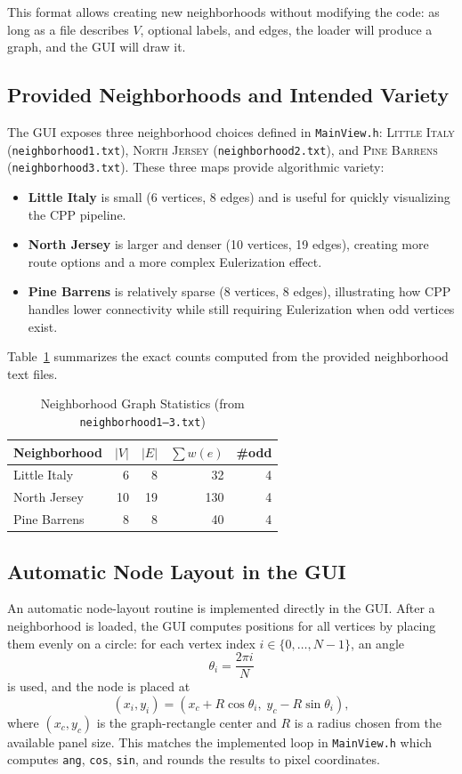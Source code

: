 \documentclass[conference]{IEEEtran}
\begin{document}
This format allows creating new neighborhoods without modifying the code: as long as a file describes $V$, optional labels, and edges, the loader will produce a graph, and the GUI will draw it.

\subsection{Provided Neighborhoods and Intended Variety}
The GUI exposes three neighborhood choices defined in \texttt{MainView.h}:
\textsc{Little Italy} (\texttt{neighborhood1.txt}),
\textsc{North Jersey} (\texttt{neighborhood2.txt}), and
\textsc{Pine Barrens} (\texttt{neighborhood3.txt}).
These three maps provide algorithmic variety:
\begin{itemize}
  \item \textbf{Little Italy} is small (6 vertices, 8 edges) and is useful for quickly visualizing the CPP pipeline.
  \item \textbf{North Jersey} is larger and denser (10 vertices, 19 edges), creating more route options and a more complex Eulerization effect.
  \item \textbf{Pine Barrens} is relatively sparse (8 vertices, 8 edges), illustrating how CPP handles lower connectivity while still requiring Eulerization when odd vertices exist.
\end{itemize}

Table~\ref{tab:neigh} summarizes the exact counts computed from the provided neighborhood text files.

\begin{table}[t]
\caption{Neighborhood Graph Statistics (from \texttt{neighborhood1--3.txt})}
\label{tab:neigh}
\centering
\begin{tabular}{lrrrr}
\toprule
Neighborhood & $|V|$ & $|E|$ & $\sum w(e)$ & \#odd \\
\midrule
Little Italy   & 6  & 8  & 32  & 4 \\
North Jersey   & 10 & 19 & 130 & 4 \\
Pine Barrens   & 8  & 8  & 40  & 4 \\
\bottomrule
\end{tabular}
\end{table}

\subsection{Automatic Node Layout in the GUI}
An automatic node-layout routine is implemented directly in the GUI.
After a neighborhood is loaded, the GUI computes positions for all vertices by placing them evenly on a circle:
for each vertex index $i\in\{0,\dots,N-1\}$, an angle
\[
  \theta_i = \frac{2\pi i}{N}
\]
is used, and the node is placed at
\[
  (x_i,y_i) = (x_c + R\cos\theta_i,\; y_c - R\sin\theta_i),
\]
where $(x_c,y_c)$ is the graph-rectangle center and $R$ is a radius chosen from the available panel size.
This matches the implemented loop in \texttt{MainView.h} which computes \texttt{ang}, \texttt{cos}, \texttt{sin}, and rounds the results to pixel coordinates.
\end{document}
